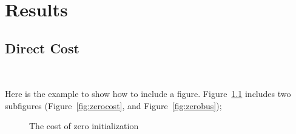 \chapter{Results}
\label{cha:result}




\section{Direct Cost}\
\label{sec:direct_cost}

Here is the example to show how to include a figure. Figure~\ref{fig:cost}
includes two subfigures (Figure~\ref{fig:zerocost}, and Figure~\ref{fig:zerobus});

\begin{figure}
  \label{fig:cost}
  \caption{The cost of zero initialization}
\end{figure}


